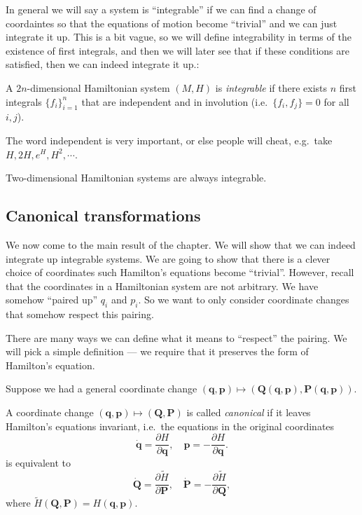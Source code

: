 \documentclass[a4paper]{article}
\begin{document}
In general we will say a system is ``integrable'' if we can find a change of coordaintes so that the equations of motion become ``trivial'' and we can just integrate it up. This is a bit vague, so we will define integrability in terms of the existence of first integrals, and then we will later see that if these conditions are satisfied, then we can indeed integrate it up.:
\begin{defi}
  A $2n$-dimensional Hamiltonian system $(M, H)$ is \emph{integrable} if there exists $n$ first integrals $\{f_i\}_{i = 1}^n$ that are independent and in involution (i.e.\ $\{f_i, f_j\} = 0$ for all $i, j$).
\end{defi}
The word independent is very important, or else people will cheat, e.g.\ take $H, 2H, e^H, H^2, \cdots$.

\begin{eg}
  Two-dimensional Hamiltonian systems are always integrable.
\end{eg}

\subsection{Canonical transformations}
We now come to the main result of the chapter. We will show that we can indeed integrate up integrable systems. We are going to show that there is a clever choice of coordinates such Hamilton's equations become ``trivial''. However, recall that the coordinates in a Hamiltonian system are not arbitrary. We have somehow ``paired up'' $q_i$ and $p_i$. So we want to only consider coordinate changes that somehow respect this pairing.

There are many ways we can define what it means to ``respect'' the pairing. We will pick a simple definition --- we require that it preserves the form of Hamilton's equation.

Suppose we had a general coordinate change $(\mathbf{q}, \mathbf{p}) \mapsto (\mathbf{Q}(\mathbf{q}, \mathbf{p}), \mathbf{P}(\mathbf{q}, \mathbf{p}))$.

\begin{defi}
  A coordinate change $(\mathbf{q}, \mathbf{p}) \mapsto (\mathbf{Q}, \mathbf{P})$ is called \emph{canonical} if it leaves Hamilton's equations invariant, i.e.\ the equations in the original coordinates
  \[
    \dot{\mathbf{q}} = \frac{\partial H}{\partial \mathbf{q}},\quad \mathbf{p} = -\frac{\partial H}{\partial \mathbf{q}}.
  \]
  is equivalent to
  \[
    \dot{\mathbf{Q}} = \frac{\partial \tilde{H}}{\partial \mathbf{P}},\quad \dot{\mathbf{P}} = -\frac{\partial \tilde{H}}{\partial \mathbf{Q}},
  \]
  where $\tilde{H}(\mathbf{Q}, \mathbf{P}) = H(\mathbf{q}, \mathbf{p})$.
\end{defi}
\end{document}
